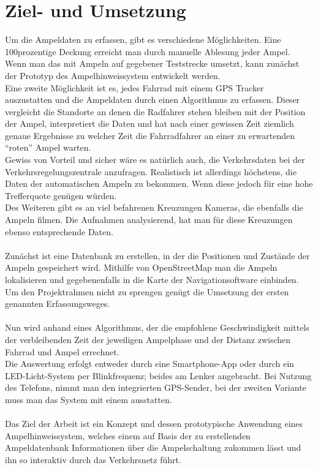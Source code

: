 \section{Ziel- und Umsetzung}
Um die Ampeldaten zu erfassen, gibt es verschiedene Möglichkeiten. Eine 100prozentige Deckung erreicht man durch manuelle Ablesung jeder Ampel. Wenn man das mit Ampeln auf gegebener Teststrecke umsetzt, kann zunächst der Prototyp des Ampelhinweissystem entwickelt werden. \\
Eine zweite Möglichkeit ist es, jedes Fahrrad mit einem \gls{GPS} Tracker auszustatten und die Ampeldaten durch einen Algorithmus zu erfassen. Dieser vergleicht die Standorte an denen die Radfahrer stehen bleiben mit der Position der Ampel, interpretiert die Daten und hat nach einer gewissen Zeit ziemlich genaue Ergebnisse zu welcher Zeit die Fahrradfahrer an einer zu erwartenden “roten” Ampel warten.\\
Gewiss von Vorteil und sicher wäre es natürlich auch, die Verkehrsdaten bei der Verkehrsregelungszentrale anzufragen. Realistisch ist allerdings höchstens, die Daten der automatischen Ampeln zu bekommen. Wenn diese jedoch für eine hohe Trefferquote genügen würden.\\
Des Weiteren gibt es an viel befahrenen Kreuzungen Kameras, die ebenfalls die Ampeln filmen. Die Aufnahmen analysierend, hat man für diese Kreuzungen ebenso entsprechende Daten.\\\\
Zunächst ist eine Datenbank zu erstellen, in der die Positionen und Zustände der Ampeln gespeichert wird. Mithilfe von OpenStreetMap man die Ampeln lokalisieren und gegebenenfalls in die Karte der Navigationsoftware einbinden. Um den Projektrahmen nicht zu sprengen genügt die Umsetzung der ersten genannten Erfassungsweges.\\\\
Nun wird anhand eines Algorithmus, der die empfohlene Geschwindigkeit mittels der verbleibenden Zeit der jeweiligen Ampelphase und der Distanz zwischen Fahrrad und Ampel errechnet.\\
Die Auswertung erfolgt entweder durch eine Smartphone-App oder durch ein \gls{LED}-Licht-System per Blinkfrequenz; beides am Lenker angebracht. Bei Nutzung des Telefons, nimmt man den integrierten \gls{GPS}-Sender, bei der zweiten Variante muss man das System mit einem ausstatten.
\\\\
Das Ziel der Arbeit ist ein Konzept und dessen prototypische Anwendung eines Ampelhinweissystem, welches einem auf Basis der zu erstellenden  Ampeldatenbank Informationen über die Ampelschaltung zukommen lässt und ihn so interaktiv durch das Verkehrsnetz führt.
